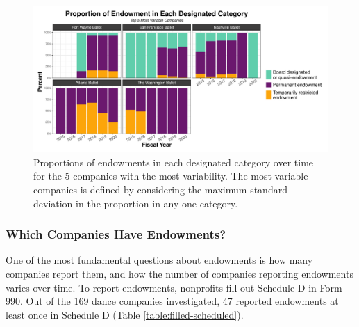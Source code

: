 \documentclass[Dance Data
Project,article,submit,moreauthors,pdftex]{mdpi}
\begin{document}
\begin{figure}[H]
\includegraphics[width=0.9\linewidth,]{../images/prop_endowment_type_most_variable} \caption{\label{fig:prop-most-variable} Proportions of endowments in each designated category over time for the 5 companies with the most variability. The most variable companies is defined by considering the maximum standard deviation in the proportion in any one category.}\label{fig:proportion-endowment-categories-most-variable}
\end{figure}

\hypertarget{which-companies-have-endowments}{%
\subsubsection{Which Companies Have
Endowments?}\label{which-companies-have-endowments}}

One of the most fundamental questions about endowments is how many
companies report them, and how the number of companies reporting
endowments varies over time. To report endowments, nonprofits fill out
Schedule D in Form 990. Out of the 169 dance companies investigated, 47
reported endowments at least once in Schedule D (Table
\ref{table:filled-scheduled}).
\end{document}
